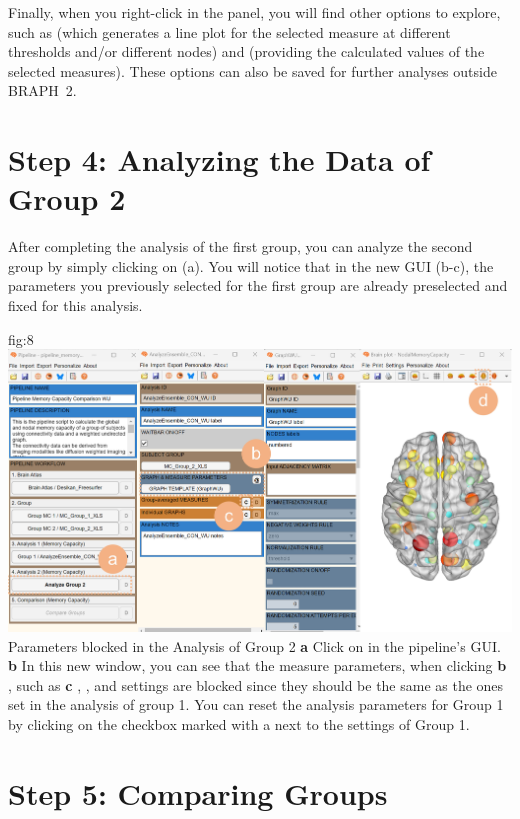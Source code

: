 \documentclass[justified]{tufte-handout}
\begin{document}
Finally, when you right-click in the  panel, you will find other options to explore, such as  (which generates a line plot for the selected measure at different thresholds and/or different nodes) and  (providing the calculated values of the selected measures). These options can also be saved for further analyses outside BRAPH~2.



\section{Step 4: Analyzing the Data of Group 2}

After completing the analysis of the first group, you can analyze the second group by simply clicking on  (a). You will notice that in the new GUI (b-c), the parameters you previously selected for the first group are already preselected and fixed for this analysis. 

{fig:8}
{
	\includegraphics{fig08.jpg}
}
{Parameters blocked in the Analysis of Group 2}
{
	{\bf a} Click on  in the pipeline's GUI.
	{\bf b} In this new window, you can see that the measure parameters, when clicking {\bf b} , such as  {\bf c} ,  ,  and  settings are blocked since they should be the same as the ones set in the analysis of group 1. You can reset the analysis parameters for Group 1 by clicking on the checkbox marked with a  next to the settings of Group 1.
}




\clearpage
\section{Step 5: Comparing Groups}
\end{document}
